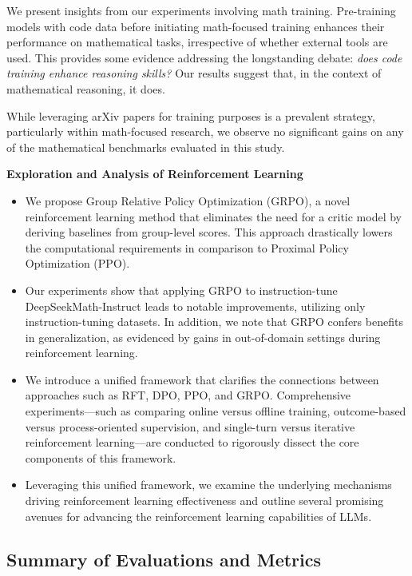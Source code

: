\item We present insights from our experiments involving math training. Pre-training models with code data before initiating math-focused training enhances their performance on mathematical tasks, irrespective of whether external tools are used. This provides some evidence addressing the longstanding debate: \textit{does code training enhance reasoning skills?} Our results suggest that, in the context of mathematical reasoning, it does.

\item While leveraging arXiv papers for training purposes is a prevalent strategy, particularly within math-focused research, we observe no significant gains on any of the mathematical benchmarks evaluated in this study.

\textbf{Exploration and Analysis of Reinforcement Learning}

\begin{itemize}[topsep=0pt]
    \item We propose Group Relative Policy Optimization (GRPO), a novel reinforcement learning method that eliminates the need for a critic model by deriving baselines from group-level scores. This approach drastically lowers the computational requirements in comparison to Proximal Policy Optimization (PPO).
    \item Our experiments show that applying GRPO to instruction-tune DeepSeekMath-Instruct leads to notable improvements, utilizing only instruction-tuning datasets. In addition, we note that GRPO confers benefits in generalization, as evidenced by gains in out-of-domain settings during reinforcement learning.
    \item We introduce a unified framework that clarifies the connections between approaches such as RFT, DPO, PPO, and GRPO. Comprehensive experiments—such as comparing online versus offline training, outcome-based versus process-oriented supervision, and single-turn versus iterative reinforcement learning—are conducted to rigorously dissect the core components of this framework.
    \item Leveraging this unified framework, we examine the underlying mechanisms driving reinforcement learning effectiveness and outline several promising avenues for advancing the reinforcement learning capabilities of LLMs.
\end{itemize}

\subsection{Summary of Evaluations and Metrics}

